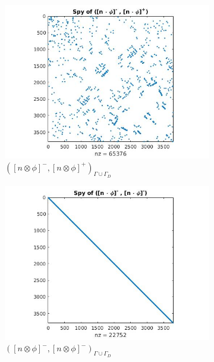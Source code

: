 \documentclass[a4paper]{book}
\begin{document}
\begin{figure}[H]
\begin{subfigure}{.5\textwidth}
  \includegraphics[width=\linewidth]{figure23.jpg}
  \caption{$([n \otimes \phi]^-,[n \otimes \phi]^+)_{\Gamma \cup \Gamma_D}$}
  \label{fig:figure23}
\end{subfigure}
\begin{subfigure}{.5\textwidth}	
\centering
  \includegraphics[width=\linewidth]{figure24.jpg}
  \caption{$([n \otimes \phi]^-,[n \otimes \phi]^-)_{\Gamma \cup \Gamma_D}$}
  \label{fig:figure24}
\end{subfigure}
\begin{subfigure}{\textwidth}	
\centering

\end{subfigure}
\end{figure}
\end{document}
